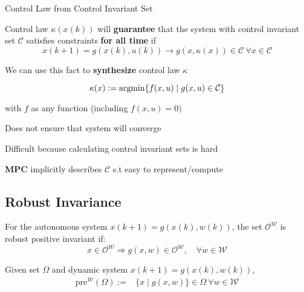 \begin{sstTitleBox}[BrickRed]{
		Control Law from Control Invariant Set
	}

	\begin{sstOnlyFrame}[BrickRed]

		\begin{centering}
			Control law $\kappa(x(k))$ will \textbf{guarantee}
			that the system
			with control invariant set $\mathcal{C}$
			satisfies constraints \textbf{for all time} if
			$$x(k+1)=g(x(k),u(k))\to
				g(x,\kappa(x)) \in \mathcal{C} \ \forall x \in \mathcal{C}$$

			We can use this fact to \textbf{synthesize}
			control law $\kappa$

		\end{centering}
		\begin{sstFullFrame}[BrickRed]\color{white}
			\[
				\kappa(x):=\operatorname{argmin}\{f(x,u) \mid g(x,u)\in\mathcal{C}\}
			\]
		\end{sstFullFrame}

		with $f$ as any function (including $f(x,u)=0)$
	\end{sstOnlyFrame}

	\begin{sstOnlyFrame}[BrickRed]
		Does not ensure that system will converge

		Difficult because calculating control invariant sets is hard

		\textbf{MPC} implicitly describes $\mathcal{C}$
		s.t easy to represent/compute
	\end{sstOnlyFrame}
\end{sstTitleBox}

\subsection{Robust Invariance}

\begin{definition}
	For the autonomous system
	$x(k+1)=g(x(k),w(k))$,
	the set $\mathcal{O}^\mathcal{W}$
	is robust positive invariant
	if:
	\[
		x\in\mathcal{O}^\mathcal{W}\Rightarrow
		g(x,w) \in \mathcal{O}^\mathcal{W},
		\quad \forall w \in \mathcal{W}
	\]
\end{definition}

Given set $\Omega$ and dynamic system $x(k+1) = g(x(k), w(k))$,
\begin{align*}
	\mathrm{pre}^{\mathcal{W}}(\Omega) := & \{x \mid g(x,w)\} \in \Omega \ \forall w \in \mathcal{W}
\end{align*}


